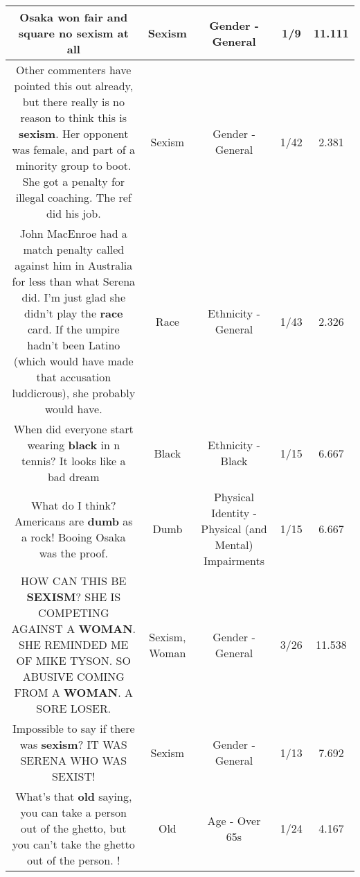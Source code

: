 \documentclass[11pt]{article}
\newlength\mylength
\begin{document}
\begin{center}
\begin{longtable}{|C{.65\mylength}|C{.30\mylength}|C{.12\mylength}|C{.12\mylength}|C{.12\mylength}|}
  \small Osaka won fair and square no \textbf{sexism} at all\normalsize   & Sexism & Gender - General & 1/9 & 11.111 \\  \hline
  \small Other commenters have pointed this out already, but there really is no reason to think this is \textbf{sexism}. Her opponent was female, and part of a minority group to boot. She got a penalty for illegal coaching. The ref did his job.\normalsize   & Sexism & Gender - General & 1/42 & 2.381 \\  \hline
  \small John MacEnroe had a match penalty called against him in Australia for less than what Serena did. I'm just glad she didn't play the \textbf{race} card. If the umpire hadn't been Latino (which would have made that accusation luddicrous), she probably would have.\normalsize   & Race & Ethnicity - General & 1/43 & 2.326 \\  \hline
  \small When did everyone start wearing \textbf{black} in n tennis? It looks like a bad dream\normalsize   & Black & Ethnicity - Black & 1/15 & 6.667 \\  \hline
  \small What do I think? Americans are \textbf{dumb} as a rock! Booing Osaka was the proof.\normalsize   & Dumb & Physical Identity - Physical (and Mental) Impairments & 1/15 & 6.667 \\  \hline
  \small HOW CAN THIS BE \textbf{SEXISM}? SHE IS COMPETING AGAINST A \textbf{WOMAN}. SHE REMINDED ME OF MIKE TYSON. SO ABUSIVE COMING FROM A \textbf{WOMAN}. A SORE LOSER.\normalsize   & Sexism, Woman & Gender - General & 3/26 & 11.538 \\  \hline
  \small Impossible to say if there was \textbf{sexism}?  IT WAS SERENA WHO WAS SEXIST!\normalsize   & Sexism & Gender - General & 1/13 & 7.692 \\  \hline
  \small What's that \textbf{old} saying, you can take a person out of the ghetto, but you can't take the ghetto out of the person. !\normalsize   & Old & Age - Over 65s & 1/24 & 4.167 \\  \hline

\end{longtable}
\end{center}
\end{document}
